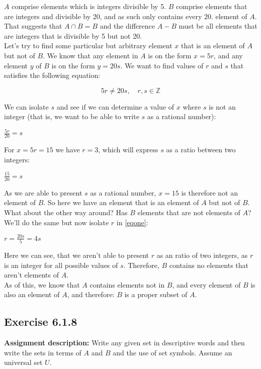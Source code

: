 \documentclass{report}
\newcommand{\cent}[1]{\begin{center}#1\end{center}}
\newcommand{\mat}[2]{\begin{equation} \label{#2}#1\end{equation}}
\newcommand{\doubleZ}{\mathbb{Z}}
\newcommand{\In}{\! \in \!}
\newcommand{\Assign}{\textbf{Assignment description: }}
\newcommand{\QED}{\boxed{}}
\newcommand{\Exercise}[1]{\subsection{Exercise #1}}
\begin{document}
	$A$ comprise elements which is integers divisible by 5. $B$ comprise elements that are integers and  divisible by 20, and as such only contains every 20. element of $A$. That suggests that  $A \cap B = B$ and the difference $A - B$ must be all elements that are integers that is divisible by 5 but not 20.\\
	
	Let's try to find some particular but arbitrary element $x$ that is an element of $A$ but not of $B$. We know that any element in $A$ is on the form $x = 5r$, and any element $y$ of $B$ is on the form $y = 20s $. We want to find values of $r$ and $s$ that satisfies the following equation:
	
	\mat{5r\neq20s, \quad r,s \In \doubleZ}{eqone}
	
	We can isolate $s$ and see if we can determine a value of $x$ where $s$ is not an integer (that is, we want to be able to write $s$ as a rational number):
	
	\cent{$\frac{5r}{20} = s$}
	
	For $x = 5r=15$ we have $r=3$, which will express $s$ as a ratio between two integers:
	
	\cent{$\frac{15}{20} = s$}
	
	As we are able to present $s$ as a rational number, $x=15$ is therefore not an element of $B$. So here we have an element that is an element of $A$ but not of $B$. What about the other way around? Has $B$ elements that are not elements of $A$? We'll do the same but now isolate $r$ in \eqref{eqone}:
	
	\cent{$r = \frac{20s}{5} = 4s $}
	
	Here we can see, that we aren't able to present $r$ as an ratio of two integers, as $r$ is an integer for all possible values of $s$. Therefore, $B$ contains no elements that aren't elements of $A$.\\
	
	As of this, we know that $A$ contains elements not in $B$, and every element of $B$ is also an element of $A$, and therefore: $B$ is a proper subset of $A$.\\
	\QED
	
	\Exercise{6.1.8}
	
	\Assign
	Write any given set in descriptive words and then write the sets in terms of $A$ and $B$ and the use of set symbols. Assume an universal set $U$.\\
	
\end{document}
